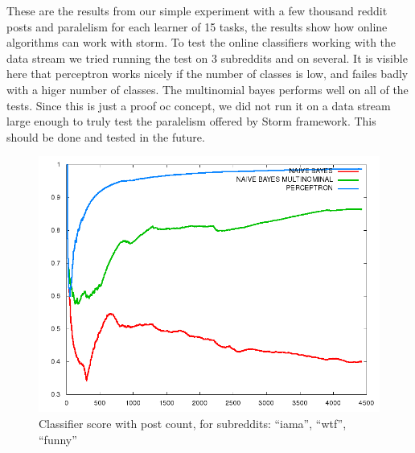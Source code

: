 \documentclass[journal]{IEEEtran/IEEEtran}
\begin{document}
These are the results from our simple experiment with a few thousand reddit posts and paralelism for each learner of 15 tasks, the results show how online algorithms can work with storm. To test the online classifiers working with the data stream we tried running the test on 3 subreddits and on several. It is visible here that perceptron works nicely if the number of classes is low, and failes badly with a higer number of classes. The multinomial bayes performs well on all of the tests. Since this is just a proof oc concept, we did not run it on a data stream large enough to truly test the paralelism offered by Storm framework. This should be done and tested in the future.



\begin{figure}[htbp]
    \begin{center}
        \includegraphics[scale=0.30]{img/plot.png}
        \caption{Classifier score with post count, for subreddits: ``iama'', ``wtf'', ``funny'' }
        \label{res3}
    \end{center}
\end{figure}
\end{document}
